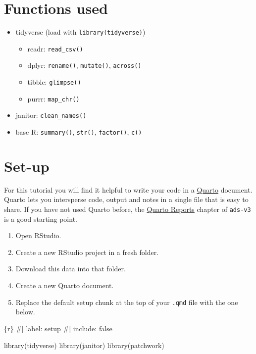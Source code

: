 \documentclass[
  english,
  letterpaper,
]{book}
\newenvironment{Shaded}{\begin{snugshade}}{\end{snugshade}}
\newcommand{\CommentTok}[1]{\textcolor[rgb]{0.37,0.37,0.37}{#1}}
\newcommand{\FunctionTok}[1]{\textcolor[rgb]{0.28,0.35,0.67}{#1}}
\newcommand{\InformationTok}[1]{\textcolor[rgb]{0.37,0.37,0.37}{#1}}
\newcommand{\NormalTok}[1]{\textcolor[rgb]{0.00,0.23,0.31}{#1}}
\providecommand{\tightlist}{%
  \setlength{\itemsep}{0pt}\setlength{\parskip}{0pt}}
\begin{document}
\section{Functions used}\label{functions-used}

\begin{itemize}
\tightlist
\item
  tidyverse (load with \texttt{library(tidyverse)})

  \begin{itemize}
  \tightlist
  \item
    readr: \texttt{read\_csv()}
  \item
    dplyr: \texttt{rename()}, \texttt{mutate()}, \texttt{across()}
  \item
    tibble: \texttt{glimpse()}
  \item
    purrr: \texttt{map\_chr()}
  \end{itemize}
\item
  janitor: \texttt{clean\_names()}
\item
  base R: \texttt{summary()}, \texttt{str()}, \texttt{factor()},
  \texttt{c()}
\end{itemize}

\section{Set-up}\label{set-up}

For this tutorial you will find it helpful to write your code in a
\href{https://quarto.org/}{Quarto} document. Quarto lets you intersperse
code, output and notes in a single file that is easy to share. If you
have not used Quarto before, the
\href{https://psyteachr.github.io/ads-v3/02-reports.html}{Quarto
Reports} chapter of \texttt{ads-v3} is a good starting point.

\begin{enumerate}
\def\labelenumi{\arabic{enumi}.}
\tightlist
\item
  Open RStudio.
\item
  Create a new RStudio project in a fresh folder.
\item
  Download this data into that folder.
\item
  Create a new Quarto document.
\item
  Replace the default setup chunk at the top of your \texttt{.qmd} file
  with the one below.
\end{enumerate}

\begin{Shaded}
\begin{Highlighting}[]
\InformationTok{\textasciigrave{}\textasciigrave{}\textasciigrave{}\{r\}}
\CommentTok{\#| label: setup}
\CommentTok{\#| include: false}

\FunctionTok{library}\NormalTok{(tidyverse)}
\FunctionTok{library}\NormalTok{(janitor)}
\FunctionTok{library}\NormalTok{(patchwork)}
\InformationTok{\textasciigrave{}\textasciigrave{}\textasciigrave{}}
\end{Highlighting}
\end{Shaded}
\end{document}
